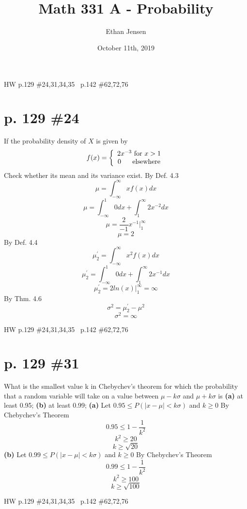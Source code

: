 \documentclass[12pt]{article}
\title{Math 331 A - Probability}
\author{Ethan Jensen }
\date{October 11th, 2019}
\begin{document}
\maketitle HW p.129 \#24,31,34,35 \ p.142 \#62,72,76

\section[20pt]{p. 129 \#24}

If the probability density of \(X\) is given by \newline
\[f(x) = \left\{\begin{array}{ccc}
2x^{-3} \  \textup{for} \ x>1 \\
0 \ \ \ \ \ \textup{elsewhere}
\end{array}\right.\]
Check whether its mean and its variance exist. \newline
\newline
By Def. 4.3
\[\mu = \int_{-\infty}^{\infty}xf(x)dx \]
\[\mu = \int_{-\infty}^{1}0dx + \int_{1}^{\infty}2x^{-2}dx\]
\[\mu = \frac{2}{-1}x^{-1}|^{\infty}_1\]
\[\mu = 2\]
 \newline
By Def. 4.4
\[\mu_2^{'}=\int_{-\infty}^{\infty}x^2f(x)dx\]
\[\mu_2^{'} = \int_{-\infty}^{1}0dx + \int_{1}^{\infty}2x^{-1}dx\]
\[\mu_2^{'} = 2ln(x)|_1^\infty=\infty\]
By Thm. 4.6
\[\sigma^2=\mu_2^{'}-\mu^2\]
\[\sigma^2=\infty\]
\newpage
\maketitle HW p.129 \#24,31,34,35 \ p.142 \#62,72,76

\section[20pt]{p. 129 \#31}
What is the smallest value k in Chebychev's theorem for which the probability that a random variable will take on a value between \(\mu-k\sigma\) and \(\mu+k\sigma\) is \newline
\textbf{(a)} at least 0.95; \newline
\textbf{(b)} at least 0.99; \newline
\newline
\textbf{(a)} Let \(0.95 \leq P(|x-\mu|<k\sigma)\) and \(k \geq 0\) \newline
By Chebychev's Theorem
\[ 0.95 \leq 1 - \frac{1}{k^2}\]
\[ k^2 \geq 20\]
\[ k \geq \sqrt{20}\]
 \newline
\textbf{(b)} Let \(0.99 \leq P(|x-\mu|<k\sigma)\) and \(k \geq 0\) \newline
By Chebychev's Theorem
\[ 0.99 \leq 1 - \frac{1}{k^2}\]
\[ k^2 \geq 100\]
\[ k \geq \sqrt{100}\]
 \newline
\newpage
\maketitle HW p.129 \#24,31,34,35 \ p.142 \#62,72,76
\end{document}

